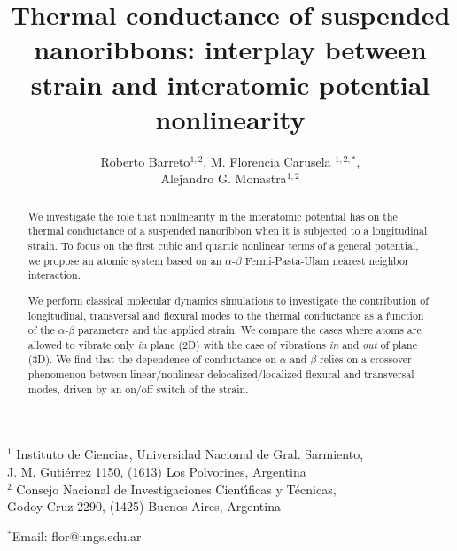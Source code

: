 \documentclass[12pt]{article}
\begin{document}
\title{ Thermal conductance of suspended nanoribbons: interplay between strain and interatomic potential nonlinearity }


\author{ Roberto Barreto$^{1,2}$, M. Florencia Carusela $^{1,2,*}$,\\Alejandro G. Monastra$^{1,2}$}

\maketitle

\begin{center}
$^1$ Instituto de Ciencias, Universidad Nacional de Gral. Sarmiento, \\J. M. Guti\'errez 1150, (1613) Los Polvorines, Argentina\\
$^{2}$ Consejo Nacional de Investigaciones Cient\'\i ficas y T\'ecnicas, \\ Godoy Cruz 2290, (1425) Buenos Aires, Argentina
\end{center}



$^{*}$Email: flor@ungs.edu.ar


\renewcommand{\thesection}{\Roman{section}}	%

\begin{abstract} 

We investigate the role that nonlinearity in the interatomic potential has on the thermal conductance of a suspended nanoribbon when it is subjected to a longitudinal strain. To focus on the first cubic and quartic nonlinear terms of a general potential, we propose an atomic system based on an $\alpha$-$\beta$ Fermi-Pasta-Ulam nearest neighbor interaction.

We perform classical molecular dynamics simulations to investigate the contribution of longitudinal, transversal and flexural modes to the thermal conductance as a function of the $\alpha$-$\beta$ parameters and the applied strain.  We compare the cases where atoms are allowed to vibrate only {\it in} plane (2D) with the case of vibrations {\it in} and {\it out} of plane (3D). We find that the dependence of conductance on $\alpha$ and $\beta$ relies on a crossover phenomenon between linear/nonlinear delocalized/localized flexural and transversal modes, driven by an on/off switch of the strain.

\end{abstract}
\end{document}
